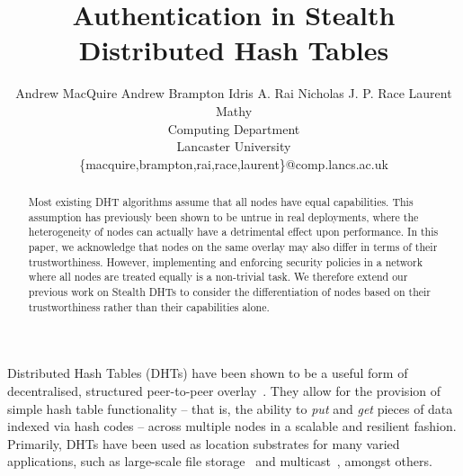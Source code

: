 \documentclass[times, 10pt,twocolumn]{article}
\begin{document}
\title{Authentication in Stealth Distributed Hash Tables}

\author{
Andrew MacQuire \hspace{1em}
Andrew Brampton \hspace{1em}
Idris A. Rai \hspace{1em}
Nicholas J. P. Race \hspace{1em}
Laurent Mathy\\
Computing Department \\
Lancaster University \\
\{macquire,brampton,rai,race,laurent\}@comp.lancs.ac.uk\\
}

\maketitle
\thispagestyle{empty}

\begin{abstract}
Most existing DHT algorithms assume that all nodes have equal
capabilities. This assumption has previously been shown to be untrue in
real deployments, where the heterogeneity of nodes can actually have a
detrimental effect upon performance. In this paper, we acknowledge that
nodes on the same overlay may also differ in terms of their
trustworthiness. However, implementing and enforcing security policies
in a network where all nodes are treated equally is a non-trivial task.
We therefore extend our previous work on Stealth DHTs to consider the
differentiation of nodes based on their trustworthiness rather than
their capabilities alone. %
\end{abstract}

\label{sect-intro}

Distributed Hash Tables (DHTs) have been shown to be a useful form of
decentralised, structured peer-to-peer
overlay~\cite{Rowstron01Pastry}\cite{Stoica01Chord}\cite{Zhao01Tapestry}\cite{Ratnasamy01Scalable}.
They allow for the provision of simple hash table functionality -- that
is, the ability to \emph{put} and \emph{get} pieces of data indexed via
hash codes -- across multiple nodes in a scalable and resilient
fashion. Primarily, DHTs have been used as location substrates for many
varied applications, such as large-scale file
storage~\cite{Druschel01PAST}\cite{Dabek01Wide}\cite{Kubiatowicz00OceanStore}
and multicast~\cite{Rowstron01SCRIBE}\cite{Zhuang01Bayeux}, amongst
others.
\end{document}
